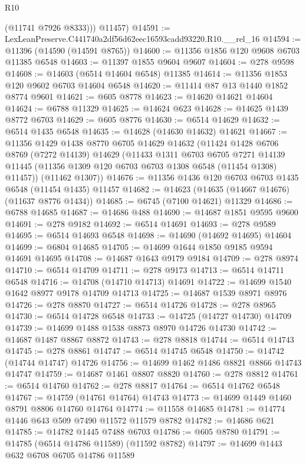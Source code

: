 \begin{lexlean}{R10}
\begin{coremodule}
          (@11741 @7926 @8333)))
      @11457)
@14591 := LexLeanPreserve.C441740a2df56d62eec16593cadd93220.R10.__rel_16
@14594 := @11396 (@14590 (@14591 @8765))
@14600 := @11356 @1856 @120 @9608 @6703 @11385 @6548
@14603 := @11397 @1855 @9604 @9607
@14604 := @278 @9598
@14608 := @14603 (@6514 @14604 @6548) @11385
@14614 := @11356 @1853 @120 @9602 @6703 @14604 @6548
@14620 := @11414 @87 @13 @1440 @1852 @8774 @9601
@14621 := @605 @8778
@14623 := @14620 @14621 @14604
@14624 := @6788 @11329
@14625 := @14624 @623
@14628 := @14625 @1439 @8772 @6703
@14629 := @605 @8776
@14630 := @6514 @14629
@14632 := @6514 @1435 @6548
@14635 := @14628 (@14630 @14632) @14621
@14667 := @11356
    @1429
    @1438
    @8770
    @6705
    @14629
    @14632
    (@11424
      @1428
      @6706
      @8769
      (@7272 @14139)
      @14629
      (@11433
        @1311
        @6703
        @6705
        @7271
        @14139
        @11445
        (@11356 @1309 @120 @6703 @6703 @1308 @6548 (@11454 @1308) @11457))
      (@11462 @1307))
@14676 := @11356 @1436 @120 @6703 @6703 @1435 @6548 (@11454 @1435) @11457
@14682 := @14623 (@14635 (@14667 @14676) (@11637 @8776 @1434))
@14685 := @6745 (@7100 @14621) @11329
@14686 := @6788 @14685
@14687 := @14686 @488
@14690 := @14687 @1851 @9595 @9600
@14691 := @278 @9182
@14692 := @6514 @14691
@14693 := @278 @9589
@14695 := @6514 @14693 @6548
@14698 := @14690 (@14692 @14695) @14604
@14699 := @6804 @14685
@14705 := @14699 @1644 @1850 @9185 @9594 @14691 @14695
@14708 := @14687 @1643 @9179 @9184
@14709 := @278 @8974
@14710 := @6514 @14709
@14711 := @278 @9173
@14713 := @6514 @14711 @6548
@14716 := @14708 (@14710 @14713) @14691
@14722 := @14699 @1540 @1642 @8977 @9178 @14709 @14713
@14725 := @14687 @1539 @8971 @8976
@14726 := @278 @8870
@14727 := @6514 @14726
@14728 := @278 @8965
@14730 := @6514 @14728 @6548
@14733 := @14725 (@14727 @14730) @14709
@14739 := @14699 @1488 @1538 @8873 @8970 @14726 @14730
@14742 := @14687 @1487 @8867 @8872
@14743 := @278 @8818
@14744 := @6514 @14743
@14745 := @278 @8861
@14747 := @6514 @14745 @6548
@14750 := @14742 (@14744 @14747) @14726
@14756 := @14699 @1462 @1486 @8821 @8866 @14743 @14747
@14759 := @14687 @1461 @8807 @8820
@14760 := @278 @8812
@14761 := @6514 @14760
@14762 := @278 @8817
@14764 := @6514 @14762 @6548
@14767 := @14759 (@14761 @14764) @14743
@14773 := @14699 @1449 @1460 @8791 @8806 @14760 @14764
@14774 := @11558 @14685
@14781 := @14774 @1446 @643 @509 @7490 @11572 @11579 @8782
@14782 := @14686 @621
@14785 := @14782 @1445 @7488 @6703
@14786 := @605 @8780
@14791 := @14785 (@6514 @14786 @11589) (@11592 @8782)
@14797 := @14699 @1443 @632 @6708 @6705 @14786 @11589

\end{coremodule}
\end{lexlean}
